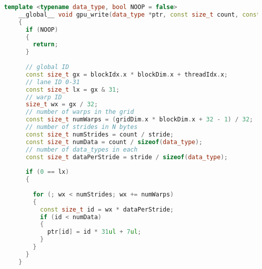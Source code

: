 \begin{lstlisting}[language=c++, caption=GPU Write Function, label=lst:cpu-write]
    template <typename data_type, bool NOOP = false>
    __global__ void gpu_write(data_type *ptr, const size_t count, const size_t stride)
    {
      if (NOOP)
      {
        return;
      }
    
      // global ID
      const size_t gx = blockIdx.x * blockDim.x + threadIdx.x;
      // lane ID 0-31
      const size_t lx = gx & 31;
      // warp ID
      size_t wx = gx / 32;
      // number of warps in the grid
      const size_t numWarps = (gridDim.x * blockDim.x + 32 - 1) / 32;
      // number of strides in N bytes
      const size_t numStrides = count / stride;
      const size_t numData = count / sizeof(data_type);
      // number of data_types in each
      const size_t dataPerStride = stride / sizeof(data_type);
    
      if (0 == lx)
      {
    
        for (; wx < numStrides; wx += numWarps)
        {
          const size_t id = wx * dataPerStride;
          if (id < numData)
          {
            ptr[id] = id * 31ul + 7ul;
          }
        }
      }
    }
\end{lstlisting}

